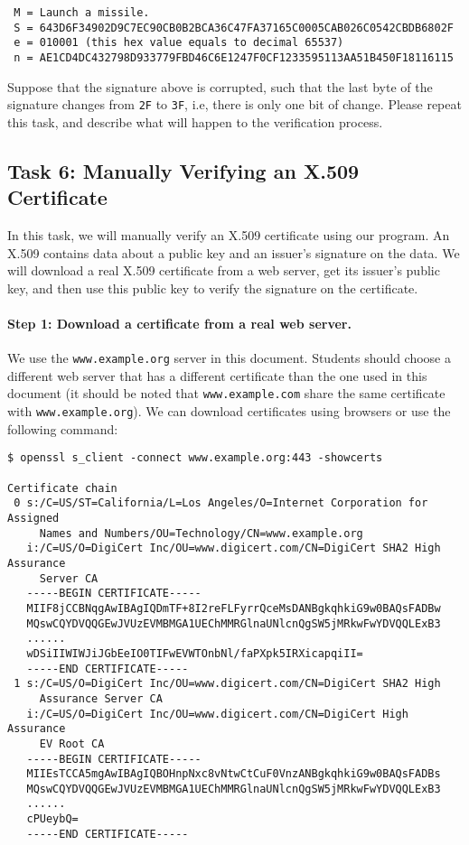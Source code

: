 \begin{lstlisting}
 M = Launch a missile.
 S = 643D6F34902D9C7EC90CB0B2BCA36C47FA37165C0005CAB026C0542CBDB6802F
 e = 010001 (this hex value equals to decimal 65537)
 n = AE1CD4DC432798D933779FBD46C6E1247F0CF1233595113AA51B450F18116115
\end{lstlisting}


Suppose that the signature above is corrupted, such that the
last byte of the signature changes from \texttt{2F} to \texttt{3F}, i.e, there is only one bit
of change.  Please repeat this task,
and describe what will happen to the verification process.




\subsection{Task 6: Manually Verifying an X.509 Certificate}

In this task, we will manually verify an X.509 certificate using our program.
An X.509 contains data about a public key and an issuer's signature on the data.
We will download a real X.509 certificate from a web server, get its issuer's public key, and then
use this public key to verify the signature on the certificate.


\paragraph{Step 1: Download a certificate from a real web server.}
We use the \texttt{www.example.org} server in this document. Students
should choose a different web server that has a different certificate than the one used in this
document (it should be noted that \texttt{www.example.com} share the same certificate with
\texttt{www.example.org}).
We can download certificates using browsers or use the following command:

\begin{lstlisting}
$ openssl s_client -connect www.example.org:443 -showcerts

Certificate chain
 0 s:/C=US/ST=California/L=Los Angeles/O=Internet Corporation for Assigned
     Names and Numbers/OU=Technology/CN=www.example.org
   i:/C=US/O=DigiCert Inc/OU=www.digicert.com/CN=DigiCert SHA2 High Assurance
     Server CA
   -----BEGIN CERTIFICATE-----
   MIIF8jCCBNqgAwIBAgIQDmTF+8I2reFLFyrrQceMsDANBgkqhkiG9w0BAQsFADBw
   MQswCQYDVQQGEwJVUzEVMBMGA1UEChMMRGlnaUNlcnQgSW5jMRkwFwYDVQQLExB3
   ......
   wDSiIIWIWJiJGbEeIO0TIFwEVWTOnbNl/faPXpk5IRXicapqiII=
   -----END CERTIFICATE-----
 1 s:/C=US/O=DigiCert Inc/OU=www.digicert.com/CN=DigiCert SHA2 High
     Assurance Server CA
   i:/C=US/O=DigiCert Inc/OU=www.digicert.com/CN=DigiCert High Assurance
     EV Root CA
   -----BEGIN CERTIFICATE-----
   MIIEsTCCA5mgAwIBAgIQBOHnpNxc8vNtwCtCuF0VnzANBgkqhkiG9w0BAQsFADBs
   MQswCQYDVQQGEwJVUzEVMBMGA1UEChMMRGlnaUNlcnQgSW5jMRkwFwYDVQQLExB3
   ......
   cPUeybQ=
   -----END CERTIFICATE-----
\end{lstlisting}

